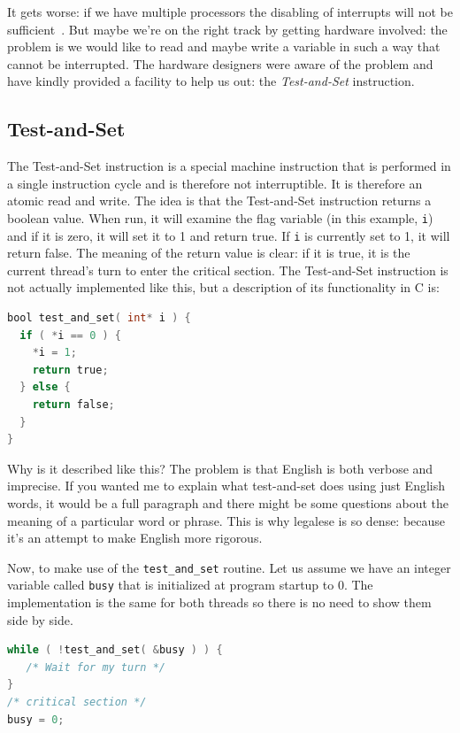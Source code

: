 It gets worse: if we have multiple processors the disabling of interrupts will not be sufficient~\cite{osi}. But maybe we're on the right track by getting hardware involved: the problem is we would like to read and maybe write a variable in such a way that cannot be interrupted. The hardware designers were aware of the problem and have kindly provided a facility to help us out: the \textit{Test-and-Set} instruction.

\subsection*{Test-and-Set}
The Test-and-Set instruction is a special machine instruction that is performed in a single instruction cycle and is therefore not interruptible. It is therefore an atomic read and write. The idea is that the Test-and-Set instruction returns a boolean value. When run, it will examine the flag variable (in this example, \texttt{i}) and if it is zero, it will set it to 1 and return true. If \texttt{i} is currently set to 1, it will return false. The meaning of the return value is clear: if it is true, it is the current thread's turn to enter the critical section. The Test-and-Set instruction is not actually implemented like this, but a description of its functionality in C is:

\begin{lstlisting}[language=C]
bool test_and_set( int* i ) {
  if ( *i == 0 ) {
    *i = 1;
    return true;
  } else {
    return false;
  }
}
\end{lstlisting}

Why is it described like this? The problem is that English is both verbose and imprecise. If you wanted me to explain what test-and-set does using just English words, it would be a full paragraph and there might be some questions about the meaning of a particular word or phrase. This is why legalese is so dense: because it's an attempt to make English more rigorous.

Now, to make use of the \texttt{test\_and\_set} routine. Let us assume we have an integer variable called \texttt{busy} that is initialized at program startup to 0. The implementation is the same for both threads so there is no need to show them side by side.

\begin{lstlisting}[language=C]
while ( !test_and_set( &busy ) ) {
   /* Wait for my turn */
}
/* critical section */
busy = 0;
\end{lstlisting}

